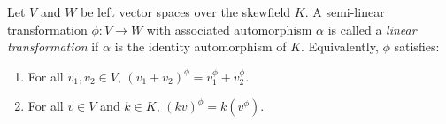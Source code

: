 Let $V$ and $W$ be left vector spaces over the skewfield $K$. A semi-linear transformation $\phi: V \to W$ with associated automorphism $\alpha$ is called a \textit{linear transformation} if $\alpha$ is the identity automorphism of $K$. Equivalently, $\phi$ satisfies:

\begin{enumerate}
\item[(i)] For all $v_1, v_2 \in V$, $(v_1 + v_2)^\phi = v_1^\phi + v_2^\phi$.
\item[(ii)] For all $v \in V$ and $k \in K$, $(kv)^\phi = k (v^\phi)$.
\end{enumerate}
